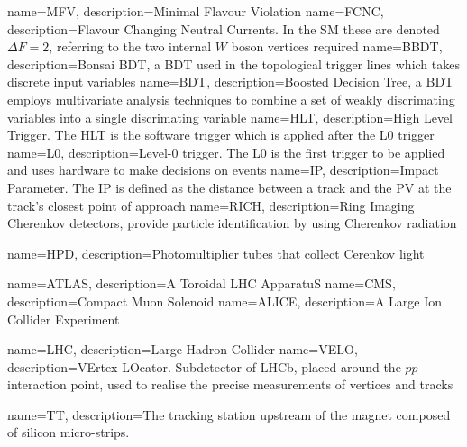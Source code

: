 {
	name=MFV,
		description={Minimal Flavour Violation}
}
{
	name=FCNC,
		description={Flavour Changing Neutral Currents. In the \Gls{SM} these are denoted $\Delta F = 2$, referring to the two internal $W$ boson vertices required}}
{
	name=BBDT,
		description={Bonsai BDT, a BDT used in the topological trigger lines which takes discrete input variables}}
{
	name=BDT,
		description={Boosted Decision Tree, a BDT employs multivariate analysis techniques to combine a set of weakly discrimating variables into a single discrimating variable}}                   
{
	name=HLT,
		description={High Level Trigger. The HLT is the software trigger which is applied after the \Gls{L0} trigger}}
{
	name=L0,
		description={Level-0 trigger. The L0 is the first trigger to be applied and uses hardware to make decisions on events  }}                   
{
	name=IP,
		description={Impact Parameter. The IP is defined as the distance between a track and the \Gls{PV} at the track's closest point of approach }}                                                                        
{
	name=RICH,
		description={Ring Imaging Cherenkov detectors, provide particle identification by using Cherenkov radiation}                         
}

{
	name=HPD,
		description={Photomultiplier tubes that collect Cerenkov light}
}

{
	name=ATLAS,
		description={A Toroidal LHC ApparatuS}
}
{
	name=CMS,
		description={Compact Muon Solenoid}
}
{
	name=ALICE,
		description={A Large Ion Collider Experiment}
}

{
	name=LHC,
		description={Large Hadron Collider}
}
{
	name=VELO,
		description={VErtex LOcator. Subdetector of LHCb, placed around the $pp$ interaction point, used to realise the precise measurements of vertices and tracks}
}

{
	name=TT,
		description={The tracking station upstream of the magnet composed of silicon micro-strips.}
}


